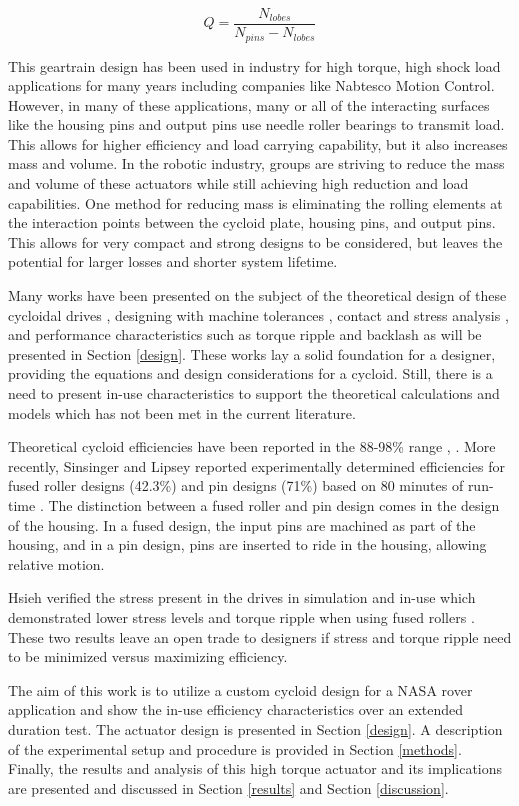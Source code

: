 \begin{equation} \label{eq:single_stage_ratio}
Q = \frac{N_{lobes}} {N_{pins} - N_{lobes}}
\end{equation}

This geartrain design has been used in industry for high torque, high shock load applications for many years including companies like Nabtesco Motion Control.
However, in many of these applications, many or all of the interacting surfaces like the housing pins and output pins use needle roller bearings to transmit load.
This allows for higher efficiency and load carrying capability, but it also increases mass and volume.
In the robotic industry, groups are striving to reduce the mass and volume of these actuators while still achieving high reduction and load capabilities.
One method for reducing mass is eliminating the rolling elements at the interaction points between the cycloid plate, housing pins, and output pins.
This allows for very compact and strong designs to be considered, but leaves the potential for larger losses and shorter system lifetime.

Many works have been presented on the subject of the theoretical design of these cycloidal drives \cite{on_the_lobe} \cite{hwang_hsieh}, designing with machine tolerances \cite{design_and_application}, contact and stress analysis \cite{li}, and performance characteristics such as torque ripple and backlash \cite{hsieh_traditional} \cite{hsieh_dynamics} as will be presented in Section \ref{design}.
These works lay a solid foundation for a designer, providing the equations and design considerations for a cycloid.
Still, there is a need to present in-use characteristics to support the theoretical calculations and models which has not been met in the current literature.

Theoretical cycloid efficiencies have been reported in the 88-98\% range \cite{Malhorta}, \cite{unified_approach}.
More recently, Sinsinger and Lipsey reported experimentally determined efficiencies for fused roller designs (42.3\%) and pin designs (71\%) based on 80 minutes of run-time \cite{cycloid_vs_harmonic}.
The distinction between a fused roller and pin design comes in the design of the housing.
In a fused design, the input pins are machined as part of the housing, and in a pin design, pins are inserted to ride in the housing, allowing relative motion.

Hsieh verified the stress present in the drives in simulation and in-use which demonstrated lower stress levels and torque ripple when using fused rollers \cite{hsieh_dynamics}.
These two results leave an open trade to designers if stress and torque ripple need to be minimized versus maximizing efficiency.

The aim of this work is to utilize a custom cycloid design for a NASA rover application and show the in-use efficiency characteristics over an extended duration test.
The actuator design is presented in Section \ref{design}.
A description of the experimental setup and procedure is provided in Section \ref{methods}.
Finally, the results and analysis of this high torque actuator and its implications are presented and discussed in Section \ref{results} and Section \ref{discussion}.

